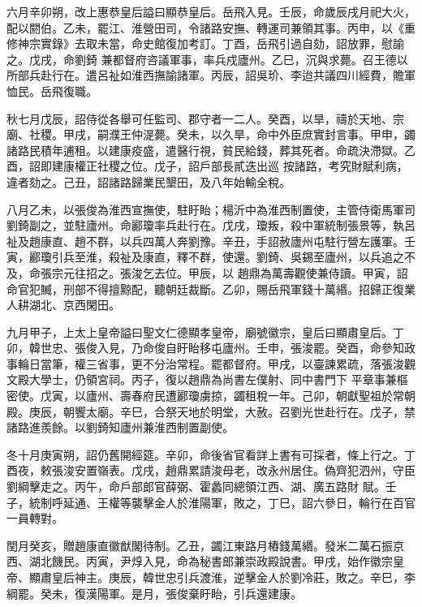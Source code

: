\begin{pinyinscope}
 六月辛卯朔，改上惠恭皇后謚曰顯恭皇后。岳飛入見。壬辰，命歲辰戌月祀大火，配以閼伯。乙未，罷江、淮營田司，令諸路安撫、轉運司兼領其事。丙申，以《重修神宗實錄》去取未當，命史館復加考訂。丁酉，岳飛引過自劾，詔放罪，慰諭之。戊戌，命劉錡
 兼都督府咨議軍事，率兵戍廬州。乙巳，沉與求薨。召王德以所部兵赴行在。遣呂祉如淮西撫諭諸軍。丙辰，詔吳玠、李迨共議四川經費，贍軍恤民。岳飛復職。



 秋七月戊辰，詔侍從各舉可任監司、郡守者一二人。癸酉，以旱，禱於天地、宗廟、社稷。甲戌，嗣濮王仲湜薨。癸未，以久旱，命中外臣庶實封言事。甲申，蠲諸路民積年逋租。以建康疫盛，遣醫行視，貧民給錢，葬其死者。命疏決滯獄。乙酉，詔即建康權正社稷之位。戊子，詔戶部長貳迭出巡
 按諸路，考究財賦利病，違者劾之。己丑，詔諸路歸業民墾田，及八年始輸全稅。



 八月乙未，以張俊為淮西宣撫使，駐盱眙；楊沂中為淮西制置使，主管侍衛馬軍司劉錡副之，並駐廬州。命酈瓊率兵赴行在。戊戌，瓊叛，殺中軍統制張景等，執呂祉及趙康直、趙不群，以兵四萬人奔劉豫。辛丑，手詔赦廬州屯駐行營左護軍。壬寅，酈瓊引兵至淮，殺祉及康直，釋不群，使還。劉錡、吳錫至廬州，以兵追之不及，命張宗元往招之。張浚乞去位。甲辰，以
 趙鼎為萬壽觀使兼侍讀。甲寅，詔命官犯贓，刑部不得擅黥配，聽朝廷裁斷。乙卯，賜岳飛軍錢十萬緡。招歸正復業人耕湖北、京西閑田。



 九月甲子，上太上皇帝謚曰聖文仁德顯孝皇帝，廟號徽宗，皇后曰顯肅皇后。丁卯，韓世忠、張俊入見，乃命俊自盱眙移屯廬州。壬申，張浚罷。癸酉，命參知政事輪日當筆，權三省事，更不分治常程。罷都督府。甲戌，以臺諫累疏，落張浚觀文殿大學士，仍領宮祠。丙子，復以趙鼎為尚書左僕射、同中書門下
 平章事兼樞密使。戊寅，以廬州、壽春府民遭酈瓊虜掠，蠲租稅一年。己卯，朝獻聖祖於常朝殿。庚辰，朝饗太廟。辛巳，合祭天地於明堂，大赦。召劉光世赴行在。戊子，禁諸路進羨餘。以劉錡知廬州兼淮西制置副使。



 冬十月庚寅朔，詔仍舊開經筵。辛卯，命後省官看詳上書有可採者，條上行之。丁酉夜，敕張浚安置嶺表。戊戌，趙鼎累請浚母老，改永州居住。偽齊犯泗州，守臣劉綱擊走之。丙午，命戶部郎官薛弼、霍蠡同總領江西、湖、廣五路財
 賦。壬子，統制呼延通、王權等襲擊金人於淮陽軍，敗之，丁巳，詔六參日，輪行在百官一員轉對。



 閏月癸亥，贈趙康直徽猷閣待制。乙丑，蠲江東路月樁錢萬緡。發米二萬石振京西、湖北饑民。丙寅，尹焞入見，命為秘書郎兼崇政殿說書。甲戌，始作徽宗皇帝、顯肅皇后神主。庚辰，韓世忠引兵渡淮，逆擊金人於劉冷莊，敗之。辛巳，李綱罷。癸未，復漢陽軍。是月，張俊棄盱眙，引兵還建康。




\end{pinyinscope}
